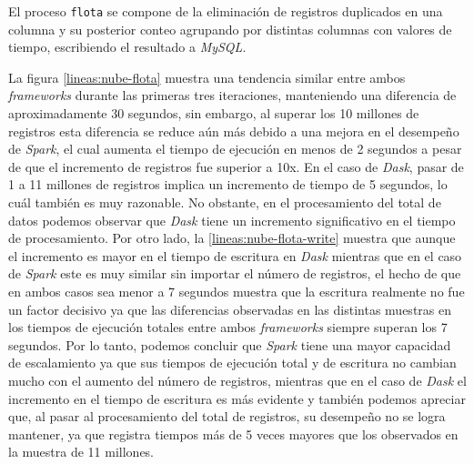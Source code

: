 El proceso \texttt{flota} se compone de la eliminación de registros duplicados en una columna y su posterior conteo agrupando por distintas columnas con valores de tiempo, escribiendo el resultado a \textit{MySQL}.

La figura \ref{lineas:nube-flota} muestra una tendencia similar entre ambos \textit{frameworks} durante las primeras tres iteraciones, manteniendo una diferencia de aproximadamente 30 segundos, sin embargo, al superar los 10 millones de registros esta diferencia se reduce aún más debido a una mejora en el desempeño de \textit{Spark}, el cual aumenta el tiempo de ejecución en menos de 2 segundos a pesar de que el incremento de registros fue superior a 10x. En el caso de \textit{Dask}, pasar de 1 a 11 millones de registros implica un incremento de tiempo de 5 segundos, lo cuál también es muy razonable. No obstante, en el procesamiento del total de datos podemos observar que \textit{Dask} tiene un incremento significativo en el tiempo de procesamiento. Por otro lado, la \ref{lineas:nube-flota-write} muestra que aunque el incremento es mayor en el tiempo de escritura en \textit{Dask} mientras que en el caso de \textit{Spark} este es muy similar sin importar el número de registros, el hecho de que en ambos casos sea menor a 7 segundos muestra que la escritura realmente no fue un factor decisivo ya que las diferencias observadas en las distintas muestras en los tiempos de ejecución totales entre ambos \textit{frameworks} siempre superan los 7 segundos. Por lo tanto, podemos concluir que \textit{Spark} tiene una mayor capacidad de escalamiento ya que sus tiempos de ejecución total y de escritura no cambian mucho con el aumento del número de registros, mientras que en el caso de \textit{Dask} el incremento en el tiempo de escritura es más evidente y también podemos apreciar que, al pasar al procesamiento del total de registros, su desempeño no se logra mantener, ya que registra tiempos más de 5 veces mayores que los observados en la muestra de 11 millones. 



